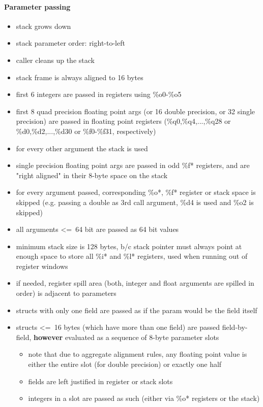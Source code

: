 \paragraph{Parameter passing}
\begin{itemize}
\item stack grows down
\item stack parameter order: right-to-left
\item caller cleans up the stack
\item stack frame is always aligned to 16 bytes
\item first 6 integers are passed in registers using \%o0-\%o5
\item first 8 quad precision floating point args (or 16 double precision, or 32 single precision) are passed in floating point registers (\%q0,\%q4,...,\%q28 or \%d0,\%d2,...,\%d30 or \%f0-\%f31, respectively)
\item for every other argument the stack is used
\item single precision floating point args are passed in odd \%f* registers, and are "right aligned" in their 8-byte space on the stack
\item for every argument passed, corresponding \%o*, \%f* register or stack space is skipped (e.g. passing a double as 3rd call argument, \%d4 is used and \%o2 is skipped)
\item all arguments \textless=\ 64 bit are passed as 64 bit values
\item minimum stack size is 128 bytes, b/c stack pointer must always point at enough space to store all \%i* and \%l* registers, used when running out of register windows
\item if needed, register spill area (both, integer and float arguments are spilled in order) is adjacent to parameters
\item structs with only one field are passed as if the param would be the field itself
\item structs \textless=\ 16 bytes (which have more than one field) are passed field-by-field, {\bf however} evaluated as a sequence of 8-byte parameter slots
\begin{itemize}
\item note that due to aggregate alignment rules, any floating point value is either the entire slot (for double precision) or exactly one half
\item fields are left justified in register or stack slots
\item integers in a slot are passed as such (either via \%o* registers or the stack)

\end{itemize}
\end{itemize}
